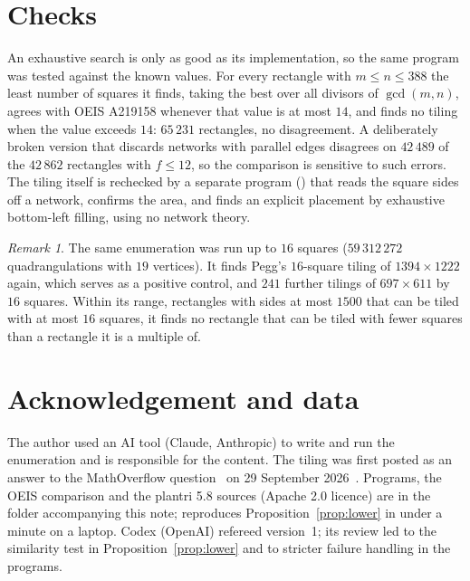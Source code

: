 \documentclass[11pt]{amsart}
\theoremstyle{remark}
\newtheorem*{remark}{Remark}
\begin{document}
\section{Checks}

An exhaustive search is only as good as its implementation, so the same program was tested against
the known values. For every rectangle with $m\le n\le 388$ the least number of squares it finds,
taking the best over all divisors of $\gcd(m,n)$, agrees with OEIS A219158 whenever that value is at
most $14$, and finds no tiling when the value exceeds $14$: $65\,231$ rectangles, no disagreement. A
deliberately broken version that discards networks with parallel edges disagrees on $42\,489$ of the
$42\,862$ rectangles with $f\le 12$, so the comparison is sensitive to such errors. The tiling itself is
rechecked by a separate program () that reads the square sides off a
network, confirms the area, and finds an explicit placement by exhaustive bottom-left filling, using
no network theory.

\begin{remark}
The same enumeration was run up to $16$ squares ($59\,312\,272$ quadrangulations with $19$ vertices).
It finds Pegg's $16$-square tiling of $1394\times1222$ again, which serves as a positive control, and
$241$ further tilings of $697\times611$ by $16$ squares. Within its range, rectangles with sides at most
$1500$ that can be tiled with at most $16$ squares, it finds no rectangle that can be tiled with fewer
squares than a rectangle it is a multiple of.
\end{remark}

\section*{Acknowledgement and data}

The author used an AI tool (Claude, Anthropic) to write and run the enumeration and is responsible for
the content. The tiling was first posted as an answer to the MathOverflow question~\cite{mo} on
29 September 2026~\cite{moa}. Programs, the OEIS comparison and the plantri 5.8 sources (Apache 2.0 licence) are
in the  folder accompanying this note;  reproduces
Proposition~\ref{prop:lower} in under a minute on a laptop. Codex (OpenAI) refereed version~1; its review led
to the similarity test in Proposition~\ref{prop:lower} and to stricter failure handling in the programs.
\end{document}
